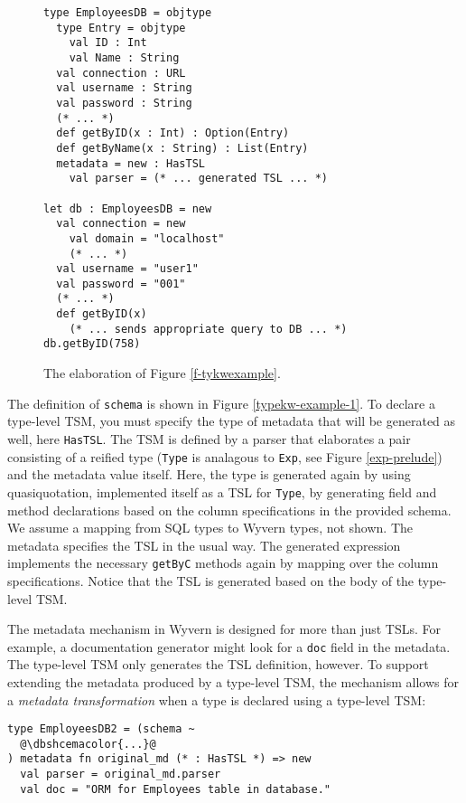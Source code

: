 \documentclass{sig-alternate}
\newcommand{\dbshcemacolor}[1]{\textcolor[HTML]{5AC3D1}{#1}}
\newcommand{\mycaption}[1]{\vspace{-4px}\caption{#1}\vspace{-2px}}
\begin{document}
\begin{figure}[t]
\begin{lstlisting}[style=wyvern]
type EmployeesDB = objtype
  type Entry = objtype
    val ID : Int
    val Name : String 
  val connection : URL
  val username : String
  val password : String
  (* ... *)
  def getByID(x : Int) : Option(Entry)
  def getByName(x : String) : List(Entry)
  metadata = new : HasTSL
    val parser = (* ... generated TSL ... *)

let db : EmployeesDB = new
  val connection = new
    val domain = "localhost"
    (* ... *)
  val username = "user1"
  val password = "001"
  (* ... *)
  def getByID(x)
    (* ... sends appropriate query to DB ... *)
db.getByID(758)
\end{lstlisting}
\mycaption{The elaboration of Figure \ref{f-tykwexample}.}
\label{typekw-example-2}
\end{figure}

The definition of \verb|schema| is shown in Figure \ref{typekw-example-1}. To declare a type-level TSM, you must specify the type of metadata that will be generated as well, here \verb|HasTSL|. The TSM is defined by a parser that elaborates a pair consisting of a reified type (\verb|Type| is analagous to \verb|Exp|, see Figure \ref{exp-prelude}) and the metadata value itself. Here, the type is generated again by using quasiquotation, implemented itself as a TSL for \verb|Type|, by generating field and method declarations based on the column specifications in the provided schema. We assume a mapping from SQL types to Wyvern types, not shown. The metadata specifies the TSL in the usual way. The generated expression implements the necessary \verb|getByC| methods again by mapping over the column specifications. Notice that the TSL is generated based on the body of the type-level TSM.

The metadata mechanism in Wyvern is designed for more than just TSLs. For example, a documentation generator might look for a \verb|doc| field in the metadata. The type-level TSM only generates the TSL definition, however. To support extending the metadata produced by a type-level TSM, the mechanism allows for a \emph{metadata transformation} when a type is declared using a type-level TSM:

\begin{lstlisting}[style=wyvern]
type EmployeesDB2 = (schema ~
  @\dbshcemacolor{...}@
) metadata fn original_md (* : HasTSL *) => new
  val parser = original_md.parser
  val doc = "ORM for Employees table in database."
\end{lstlisting}
\end{document}
